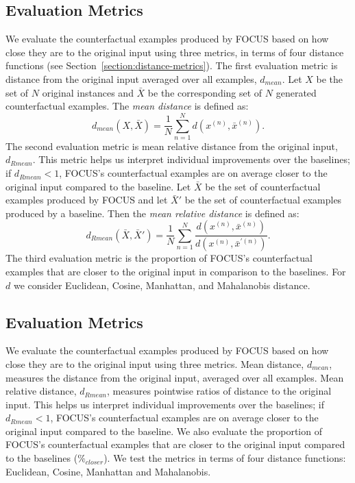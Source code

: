 \subsection{Evaluation Metrics}
\label{section:focus-evalmetrics}
We evaluate the counterfactual examples produced by FOCUS based on how close they are to the original input using three metrics, in terms of four distance functions (see Section~\ref{section:distance-metrics}).
The first evaluation metric is distance from the original input averaged over all examples, $d_\mathit{mean}$. 
Let $X$ be the set of $N$ original instances and $\bar{X}$ be the corresponding set of $N$ generated counterfactual examples.
The \emph{mean distance} is defined as:
% 
\begin{equation}
\label{eq:mean-dist}
d_\mathit{mean}(X, \bar{X}) = \frac{1}{N}\sum_{n=1}^{N}d(x^{(n)}, \bar{x}^{(n)}).
\end{equation}
%
The second evaluation metric is mean relative distance from the original input, $d_\mathit{Rmean}$. 
This metric helps us interpret individual improvements over the baselines; if $d_\mathit{Rmean} < 1$, FOCUS's counterfactual examples are on average closer to the original input compared to the baseline. 
Let $\bar{X}$ be the set of counterfactual examples produced by FOCUS and let $\bar{X}'$ be the set of counterfactual examples produced by a baseline. 
Then the \emph{mean relative distance} is defined as:
\begin{equation}
\label{eq:mean-rel-dist}
d_\mathit{Rmean}(\bar{X}, \bar{X}') = \frac{1}{N}\sum_{n=1}^{N} \frac{d(x^{(n)}, \bar{x}^{(n)})}{d(x^{(n)}, {\bar{x}}^{'(n)})}.
\end{equation}
%
The third evaluation metric is the proportion of FOCUS's counterfactual examples that are closer to the original input in comparison to the baselines. 
For $d$ we consider Euclidean, Cosine, Manhattan, and Mahalanobis distance.




\subsection{Evaluation Metrics}
\label{section:evaluation}
We evaluate the counterfactual examples produced by FOCUS based on how close they are to the original input using three metrics. 
Mean distance, $d_\mathit{mean}$, measures the distance from the original input, averaged over all examples. 
Mean relative distance, $d_\mathit{Rmean}$, measures pointwise ratios of distance to the original input. 
This helps us interpret individual improvements over the baselines; if $d_\mathit{Rmean} < 1$, FOCUS's counterfactual examples are on average closer to the original input compared to the baseline. 
We also evaluate the proportion of FOCUS's counterfactual examples that are closer to the original input compared to the baselines ($\mathit{\%_{closer}}$). 
We test the metrics in terms of four distance functions: Euclidean, Cosine, Manhattan and Mahalanobis. 
\fi






